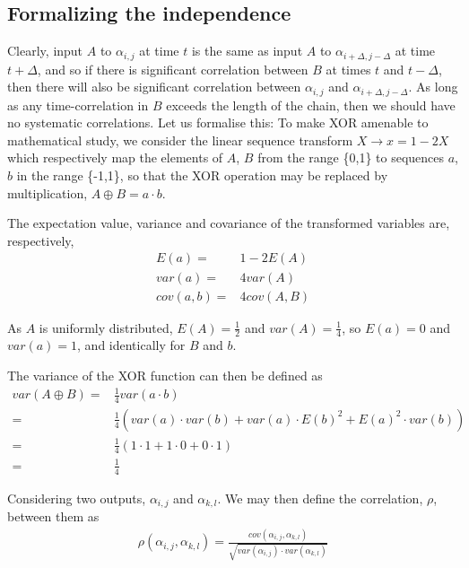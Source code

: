 \documentclass{article}
\newcommand{\xor}{\oplus}
\newcommand{\corr}[2]{\rho\left( #1 , #2 \right)}
\newcommand{\cov}[2]{\textit{cov}\left( #1 , #2 \right)}
\newcommand{\var}[1]{\textit{var}\left( #1 \right)}
\newcommand{\Exp}[1]{\textit{E}\left( #1 \right)}
\begin{document}
\subsection{Formalizing the independence}

Clearly, input $A$ to $\alpha_{i,j}$ at time $t$ is the same as input $A$ to $\alpha_{i+\Delta,j-\Delta}$ at time $t+\Delta$, and so if there is significant correlation between $B$ at times $t$ and $t-\Delta$, then there will also be significant correlation between $\alpha_{i,j}$ and $\alpha_{i+\Delta,j-\Delta}$. As long as any time-correlation in $B$ exceeds the length of the chain, then we should have no systematic correlations. Let us formalise this: To make XOR amenable to mathematical study, we consider the linear sequence transform $X \to x = 1 - 2X$ which respectively map the elements of $A$, $B$ from the range \{0,1\} to sequences $a$, $b$ in the range \{-1,1\}, so that the XOR operation may be replaced by multiplication, $A \xor B = a \cdot b$. 

The expectation value, variance and covariance of the transformed variables are, respectively,
\begin{align}
    \Exp{a} = & 1 - 2\Exp{A} \\
    \var{a} = & 4 \var{A} \\
  \cov{a}{b} = & 4 \cov{A}{B}
\end{align}

As $A$ is uniformly distributed, $\Exp{A} = \frac{1}{2}$ and $\var{A} = \frac{1}{4}$, so $\Exp{a} = 0$ and $\var{a} = 1$, and identically for $B$ and $b$.

The variance of the XOR function can then be defined as
\begin{align}
\var{A \xor B} = & \frac{1}{4} \var{a \cdot b} \\
                 = & \frac{1}{4} \left( \var{a} \cdot \var{b} + \var{a} \cdot \Exp{b}^2 + \Exp{a}^2 \cdot \var{b} \right) \\
                 = & \frac{1}{4} \left( 1 \cdot 1 + 1 \cdot 0 + 0 \cdot 1 \right) \\
                 = & \frac{1}{4} \label{eqn:var_xor}
\end{align}


Considering two outputs, $\alpha_{i,j}$ and $\alpha_{k,l}$. We may then define the correlation, $\rho$, between them as 
\begin{align}
  \corr{\alpha_{i,j}}{\alpha_{k,l}} = \frac{\cov{\alpha_{i,j}}{\alpha_{k,l}}}{\sqrt{\var{\alpha_{i,j}} \cdot \var{\alpha_{k,l}}}}
\end{align}
 
\end{document}
